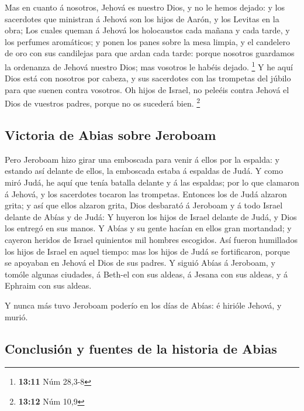  Mas en cuanto á nosotros, Jehová es nuestro Dios, y no le
hemos dejado: y los sacerdotes que ministran á Jehová son los hijos de
Aarón, y los Levitas en la obra;  Los cuales queman á
Jehová los holocaustos cada mañana y cada tarde, y los perfumes
aromáticos; y ponen los panes sobre la mesa limpia, y el candelero de
oro con sus candilejas para que ardan cada tarde: porque nosotros
guardamos la ordenanza de Jehová nuestro Dios; mas vosotros le habéis
dejado. \footnote{\textbf{13:11} Núm 28,3-8}  Y he aquí
Dios está con nosotros por cabeza, y sus sacerdotes con las trompetas
del júbilo para que suenen contra vosotros. Oh hijos de Israel, no
peleéis contra Jehová el Dios de vuestros padres, porque no os sucederá
bien. \footnote{\textbf{13:12} Núm 10,9}

\hypertarget{victoria-de-abias-sobre-jeroboam}{%
\subsection{Victoria de Abias sobre
Jeroboam}\label{victoria-de-abias-sobre-jeroboam}}

 Pero Jeroboam hizo girar una emboscada para venir á ellos
por la espalda: y estando así delante de ellos, la emboscada estaba á
espaldas de Judá.  Y como miró Judá, he aquí que tenía
batalla delante y á las espaldas; por lo que clamaron á Jehová, y los
sacerdotes tocaron las trompetas.  Entonces los de Judá
alzaron grita; y así que ellos alzaron grita, Dios desbarató á Jeroboam
y á todo Israel delante de Abías y de Judá:  Y huyeron los
hijos de Israel delante de Judá, y Dios los entregó en sus manos.
 Y Abías y su gente hacían en ellos gran mortandad; y
cayeron heridos de Israel quinientos mil hombres escogidos.
 Así fueron humillados los hijos de Israel en aquel tiempo:
mas los hijos de Judá se fortificaron, porque se apoyaban en Jehová el
Dios de sus padres.  Y siguió Abías á Jeroboam, y tomóle
algunas ciudades, á Beth-el con sus aldeas, á Jesana con sus aldeas, y á
Ephraim con sus aldeas.

 Y nunca más tuvo Jeroboam poderío en los días de Abías: é
hirióle Jehová, y murió.

\hypertarget{conclusiuxf3n-y-fuentes-de-la-historia-de-abias}{%
\subsection{Conclusión y fuentes de la historia de
Abias}\label{conclusiuxf3n-y-fuentes-de-la-historia-de-abias}}

